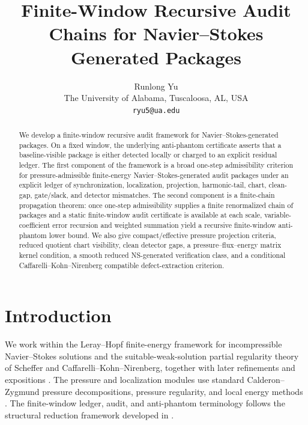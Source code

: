 \documentclass[11pt]{article}
\title{Finite-Window Recursive Audit Chains for Navier--Stokes Generated Packages}
\author{Runlong Yu\\
The University of Alabama, Tuscaloosa, AL, USA\\
\texttt{ryu5@ua.edu}}
\date{}
\numberwithin{equation}{section}
\theoremstyle{plain}
\theoremstyle{definition}
\theoremstyle{remark}
\begin{document}
\maketitle

\begin{abstract}
We develop a finite-window recursive audit framework for Navier--Stokes-generated packages. On a fixed window, the underlying anti-phantom certificate asserts that a baseline-visible package is either detected locally or charged to an explicit residual ledger. The first component of the framework is a broad one-step admissibility criterion for pressure-admissible finite-energy Navier--Stokes-generated audit packages under an explicit ledger of synchronization, localization, projection, harmonic-tail, chart, clean-gap, gate/slack, and detector mismatches. The second component is a finite-chain propagation theorem: once one-step admissibility supplies a finite renormalized chain of packages and a static finite-window audit certificate is available at each scale, variable-coefficient error recursion and weighted summation yield a recursive finite-window anti-phantom lower bound. We also give compact/effective pressure projection criteria, reduced quotient chart visibility, clean detector gaps, a pressure--flux--energy matrix kernel condition, a smooth reduced NS-generated verification class, and a conditional Caffarelli--Kohn--Nirenberg compatible defect-extraction criterion. 
\end{abstract}

\tableofcontents

\section{Introduction}

We work within the Leray--Hopf finite-energy framework for incompressible Navier--Stokes solutions \cite{Leray1934,Hopf1951} and the suitable-weak-solution partial regularity theory of Scheffer and Caffarelli--Kohn--Nirenberg, together with later refinements and expositions \cite{Scheffer1976,Scheffer1977,CKN1982,Lin1998,SereginLectureNotes}.  The pressure and localization modules use standard Calderon--Zygmund pressure decompositions, pressure regularity, and local energy methods \cite{SohrWahl1986,SereginSverak2002,ESS2003}.  The finite-window ledger, audit, and anti-phantom terminology follows the structural reduction framework developed in \cite{YuCriticalLedgers2026,YuSingularityAuditTransfer2026,YuComputationalAntiPhantom2026}.
\end{document}
